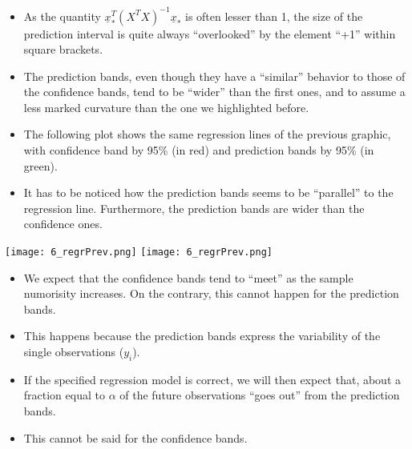 \begin{frame}
  \vspace*{.25cm}
  \begin{itemize}
    \item As the quantity $ \underline{x}_*^T(X^TX)^{-1}\underline{x}_* $ is often lesser than 1, the size of the prediction interval is quite always ``overlooked'' by the element ``+1'' within square brackets.
    \item The prediction bands, even though they have a ``similar'' behavior to those of the confidence bands, tend to be ``wider'' than the first ones, and to assume a less marked curvature than the one we highlighted before.
    \item The following plot shows the same regression lines of the previous graphic, with confidence band by  95\% (in red) and prediction bands by 95\% (in green). 
    \item It has to be noticed how the prediction bands seems to be ``parallel'' to the regression line. Furthermore, the prediction bands are wider than the confidence ones.
  \end{itemize}
\end{frame}

\begin{frame}
  \begin{center}
    {\texttt{[image: 6\_regrPrev.png]}}
    {\texttt{[image: 6\_regrPrev.png]}}
  \end{center}
\end{frame}

\begin{frame}
  \vspace*{.25cm}
  \begin{itemize}
    \item We expect that the confidence bands tend to ``meet'' as the sample numorisity increases. On the contrary, this cannot happen for the prediction bands. 
    \vspace*{.25cm}
    \item This happens because the prediction bands express the variability of the single observations ($ y_i $).
    \vspace*{.25cm}
    \item If the specified regression model is correct, we will then expect that, about a fraction equal to $ \alpha $ of the future observations ``goes out'' from the prediction bands. 
    \vspace*{.25cm}
    \item This cannot be said for the confidence bands.
  \end{itemize}
\end{frame}




